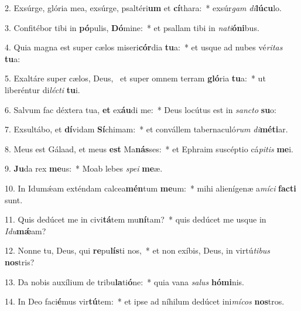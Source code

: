 2. Exsúrge, glória mea, exsúrge, psaltéri\textbf{um} et \textbf{cí}thara:~*  exsúr\textit{gam} \textit{di}\textbf{lú}\textbf{cu}lo.\

3. Confitébor tibi in \textbf{pó}pulis, \textbf{Dó}mine:~*  et psallam tibi in \textit{na}\textit{ti}\textbf{ó}\textbf{ni}bus.\

4. Quia magna est super cælos miseri\textbf{cór}dia \textbf{tu}a:~*  et usque ad nubes vé\textit{ri}\textit{tas} \textbf{tu}a:\

5. Exaltáre super cælos, Deus, \dag\  et super omnem terram \textbf{gló}ria \textbf{tu}a:~*  ut liberéntur di\textit{léc}\textit{ti} \textbf{tu}i.\

6. Salvum fac déxtera tua, \textbf{et} ex\textbf{áu}di me:~*  Deus locútus est in \textit{sanc}\textit{to} \textbf{su}o:\

7. Exsultábo, et \textbf{dí}vidam \textbf{Sí}chimam:~*  et convállem tabernaculó\textit{rum} \textit{di}\textbf{mé}\textbf{ti}ar.\

8. Meus est Gálaad, et meus \textbf{est} Ma\textbf{nás}ses:~*  et Ephraim suscéptio cá\textit{pi}\textit{tis} \textbf{me}i.\

9. \textbf{Ju}da rex \textbf{me}us:~*  Moab lebes \textit{spe}\textit{i} \textbf{me}æ.\

10. In Idumǽam exténdam calcea\textbf{mén}tum \textbf{me}um:~*  mihi alienígenæ a\textit{mí}\textit{ci} \textbf{fac}\textbf{ti} sunt.\

11. Quis dedúcet me in civi\textbf{tá}tem mu\textbf{ní}tam?~*  quis dedúcet me usque in \textit{I}\textit{du}\textbf{mǽ}am?\

12. Nonne tu, Deus, qui \textbf{re}pu\textbf{lís}ti nos,~*  et non exíbis, Deus, in virtú\textit{ti}\textit{bus} \textbf{nos}tris?\

13. Da nobis auxílium de tribu\textbf{la}ti\textbf{ó}ne:~*  quia vana \textit{sa}\textit{lus} \textbf{hó}\textbf{mi}nis.\

14. In Deo faci\textbf{é}mus vir\textbf{tú}tem:~*  et ipse ad níhilum dedúcet ini\textit{mí}\textit{cos} \textbf{nos}tros.\

